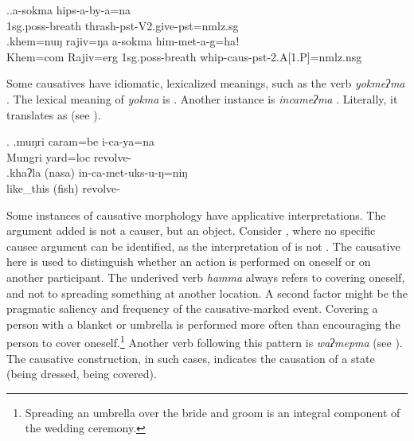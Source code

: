 	\ex.\ag.a-sokma hips-a-by-a=na\\
	{\sc 1sg.poss-}breath thrash{\sc [3sg]-pst-V2.give-pst=nmlz.sg}\\	
	 \bg.khem=nuŋ rajiv=ŋa a-sokma him-met-a-g=haǃ\\
	Khem{\sc =com}  Rajiv{\sc =erg} {\sc 1sg.poss-}breath whip{\sc -caus-pst-2.A[1.P]=nmlz.nsg}\\


Some causatives have idiomatic, lexicalized meanings, such as the verb \emph{yokmeʔma} . The lexical meaning of \emph{yokma} is . Another instance is \emph{incameʔma} . Literally, it translates as  (see \Next).

 
\ex. \ag.muŋri caram=be i-ca-ya=na\\
Mungri yard{\sc =loc} revolve-\\
\bg.khaʔla (nasa) in-ca-met-uks-u-ŋ=niŋ\\
	like\_this (fish) revolve-\\
	   
 

Some instances of causative morphology have applicative interpretations. The argument added is not a causer, but an object. Consider \Next, where no specific causee argument can be identified, as the interpretation of \Next[b] is not . The causative here is used to distinguish whether an action is performed on oneself or on another participant. The underived verb \emph{hamma}  always refers to covering oneself, and not to spreading something at another location. A second factor might be the pragmatic saliency and frequency of the causative-marked event. Covering a person with a blanket or umbrella is performed more often than encouraging the person to cover oneself.\footnote{Spreading an umbrella over the bride and groom is an integral component of the wedding ceremony.} Another verb following this pattern is  \emph{waʔmepma}  (see \Next[c]). The causative construction, in such cases, indicates the causation of a state (being dressed, being covered).  


